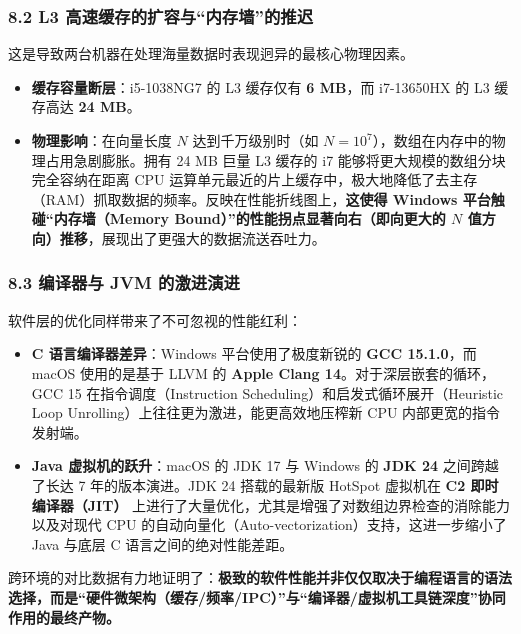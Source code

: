 \documentclass[12pt,fontset=none]{ctexart}
\providecommand{\tightlist}{%
  \setlength{\itemsep}{0pt}\setlength{\parskip}{0pt}}
\begin{document}
\subsubsection{8.2 L3
高速缓存的扩容与``内存墙''的推迟}\label{82-l3-ux9ad8ux901fux7f13ux5b58ux7684ux6269ux5bb9ux4e0eux5185ux5b58ux5899ux7684ux63a8ux8fdf}

这是导致两台机器在处理海量数据时表现迥异的最核心物理因素。

\begin{itemize}
\tightlist
\item
  \textbf{缓存容量断层}：i5-1038NG7 的 L3 缓存仅有 \textbf{6 MB}，而
  i7-13650HX 的 L3 缓存高达 \textbf{24 MB}。
\item
  \textbf{物理影响}：在向量长度 \(N\) 达到千万级别时（如
  \(N = 10^7\)），数组在内存中的物理占用急剧膨胀。拥有 24 MB 巨量 L3
  缓存的 i7 能够将更大规模的数组分块完全容纳在距离 CPU
  运算单元最近的片上缓存中，极大地降低了去主存（RAM）抓取数据的频率。反映在性能折线图上，\textbf{这使得
  Windows 平台触碰``内存墙（Memory
  Bound）''的性能拐点显著向右（即向更大的 \(N\)
  值方向）推移}，展现出了更强大的数据流送吞吐力。
\end{itemize}

\subsubsection{8.3 编译器与 JVM
的激进演进}\label{83-ux7f16ux8bd1ux5668ux4e0e-jvm-ux7684ux6fc0ux8fdbux6f14ux8fdb}

软件层的优化同样带来了不可忽视的性能红利：

\begin{itemize}
\tightlist
\item
  \textbf{C 语言编译器差异}：Windows 平台使用了极度新锐的 \textbf{GCC
  15.1.0}，而 macOS 使用的是基于 LLVM 的 \textbf{Apple Clang
  14}。对于深层嵌套的循环，GCC 15 在指令调度（Instruction
  Scheduling）和启发式循环展开（Heuristic Loop
  Unrolling）上往往更为激进，能更高效地压榨新 CPU 内部更宽的指令发射端。
\item
  \textbf{Java 虚拟机的跃升}：macOS 的 JDK 17 与 Windows 的 \textbf{JDK
  24} 之间跨越了长达 7 年的版本演进。JDK 24 搭载的最新版 HotSpot
  虚拟机在 \textbf{C2 即时编译器（JIT）}
  上进行了大量优化，尤其是增强了对数组边界检查的消除能力以及对现代 CPU
  的自动向量化（Auto-vectorization）支持，这进一步缩小了 Java 与底层 C
  语言之间的绝对性能差距。
\end{itemize}

跨环境的对比数据有力地证明了：\textbf{极致的软件性能并非仅仅取决于编程语言的语法选择，而是``硬件微架构（缓存/频率/IPC）''与``编译器/虚拟机工具链深度''协同作用的最终产物。}
\end{document}
